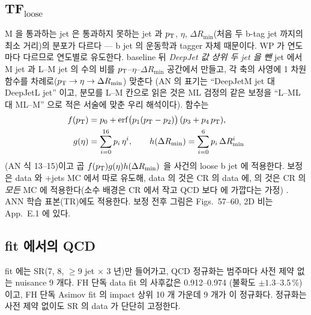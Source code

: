 \subsection{TF\texorpdfstring{$_{\text{loose}}$}{loose}}\label{sec:qcd-tth-tf}
M 을 통과하는 jet 은 통과하지 못하는 jet 과 $p_{\mathrm{T}}$, $\eta$, $\Delta R_{\min}$(처음 두 b-tag jet 까지의 최소 거리)의 분포가 다르다 — b jet 의 운동학과 tagger
자체 때문이다. WP 가 연도마다 다르므로 연도별로 유도한다. baseline 뒤 \emph{DeepJet 값 상위 두 jet 을 뺀} jet 에서
M jet 과 L–M jet 의 수의 비를 $p_{\mathrm{T}}$–$\eta$–$\Delta R_{\min}$ 공간에서 만들고, 각 축의 사영에 1 차원 함수를 차례로($p_{\mathrm{T}}\to\eta\to\Delta R_{\min}$) 맞춘다
(AN 의 표기는 ``DeepJetM jet 대 DeepJetL jet'' 이고, 분모를 L–M 칸으로 읽은 것은 ML 검정의 같은 보정을
``L–ML 대 ML–M'' 으로 적은 서술에 맞춘 우리 해석이다). 함수는
\begin{align}
f(p_{\mathrm{T}})&=p_0+\operatorname{erf}\bigl(p_1(p_{\mathrm{T}}-p_2)\bigr)\,(p_3+p_4\,p_{\mathrm{T}}), \label{eq:qcd-f}\\
g(\eta)&=\sum_{i=0}^{16}p_i\,\eta^i,\qquad h(\Delta R_{\min})=\sum_{i=0}^{6}p_i\,\Delta R_{\min}^i \label{eq:qcd-gh}
\end{align}
(AN 식 13–15)이고 곱 $f(p_{\mathrm{T}})g(\eta)h(\Delta R_{\min})$ 을 사건의 loose b jet 에 적용한다. 보정은 data 와 \ttbar{}+jets MC 에서
따로 유도해, data 의 것은 CR 의 data 에, \ttbar{} 의 것은 CR 의 \emph{모든} MC 에 적용한다(소수 배경은 CR 에서 작고 QCD 보다 \ttbar{} 에 가깝다는 가정)
. ANN 학습 표본(TR)에도 적용한다. 보정 전후 그림은 Figs.~57–60, 2D 비는
App.\ E.1 에 있다.

\subsection{fit 에서의 QCD}\label{sec:qcd-tth-fit}
fit 에는 SR(7, 8, $\ge9$ jet $\times$ 3 년)만 들어가고, QCD 정규화는 범주마다 사전 제약 없는 nuisance
 9 개다. FH 단독 data fit 의 사후값은 0.912–0.974
(불확도 $\pm1.3$–3.5\,\%)이고, FH 단독 Asimov fit 의 impact 상위 10 개 가운데 9 개가 이 정규화다. 정규화는 사전 제약
없이도 SR 의 data 가 단단히 고정한다.

